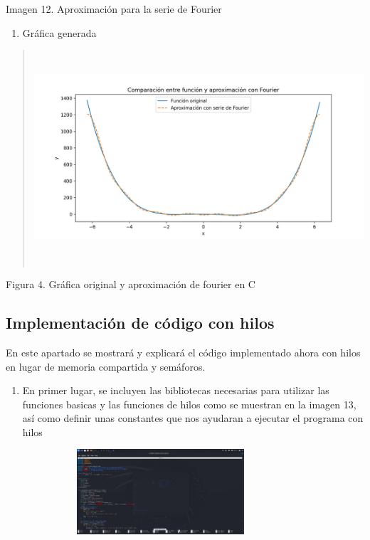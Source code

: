 Imagen 12. Aproximación para la serie de Fourier

\begin{enumerate} \def\labelenumi{\arabic{enumi}.} \setcounter{enumi}{2} \item   Gráfica generada \end{enumerate}

\begin{quote} \includegraphics[width=6.26772in,height=3.13889in]{media/image12.png} \end{quote}

Figura 4. Gráfica original y aproximación de fourier en C

\subsection{Implementación de código con hilos}\label{implementaciuxf3n-de-cuxf3digo-con-hilos}

En este apartado se mostrará y explicará el código implementado ahora con hilos en lugar de memoria compartida y semáforos.

\begin{enumerate} \def\labelenumi{\arabic{enumi}.} \item   En primer lugar, se incluyen las bibliotecas necesarias para utilizar   las funciones basicas y las funciones de hilos como se muestran en la   imagen 13, así como definir unas constantes que nos ayudaran a   ejecutar el programa con hilos \end{enumerate}

\includegraphics[width=4.53385in,height=1.24967in]{media/image4.png}

